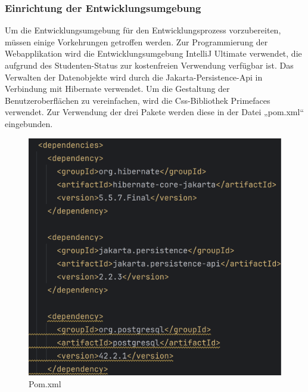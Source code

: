 \documentclass[11pt]{article}
\begin{document}
    \subsubsection{Einrichtung der Entwicklungsumgebung}
    Um die Entwicklungsumgebung für den Entwicklungsprozess vorzubereiten, müssen einige Vorkehrungen getroffen
    werden. Zur Programmierung der Webapplikation wird die Entwicklungsumgebung IntelliJ Ultimate verwendet, die aufgrund
    des Studenten-Status zur kostenfreien Verwendung verfügbar ist. 
    Das Verwalten der Datenobjekte wird durch die Jakarta-Persistence-Api in Verbindung mit Hibernate verwendet. Um die Gestaltung der Benutzeroberflächen
    zu vereinfachen, wird die Css-Bibliothek Primefaces verwendet. Zur Verwendung der drei Pakete werden diese in der Datei „pom.xml“ eingebunden.
    \begin{figure}[H]
        \centering
        \includegraphics[width=\textwidth]{abbildungen/Pom-Xml.png}
        \caption{Pom.xml}
        \label{pom-xml}
    \end{figure}

    \newpage
\end{document}
